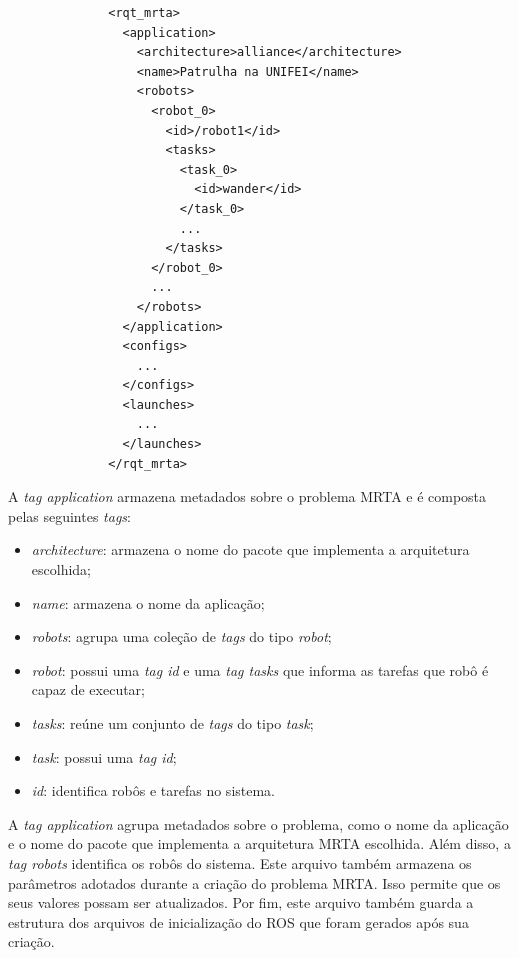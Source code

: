             \begin{lstlisting}
              <rqt_mrta>
                <application>
                  <architecture>alliance</architecture>
                  <name>Patrulha na UNIFEI</name>
                  <robots>
                    <robot_0>
                      <id>/robot1</id>
                      <tasks>
                        <task_0>
                          <id>wander</id>
                        </task_0>
                        ...
                      </tasks>
                    </robot_0>
                    ...
                  </robots>
                </application>
                <configs>
                  ...
                </configs>
                <launches>
                  ...
                </launches>
              </rqt_mrta>
            \end{lstlisting}
        
            A \textit{tag application} armazena metadados sobre o problema MRTA e é composta pelas seguintes \textit{tags}:
            
            \begin{itemize}
                \item \textit{architecture}: armazena o nome do pacote que implementa a arquitetura escolhida;
                
                \item \textit{name}: armazena o nome da aplicação;
                
                \item \textit{robots}: agrupa uma coleção de \textit{tags} do tipo \textit{robot};
                
                \item \textit{robot}: possui uma \textit{tag id} e uma \textit{tag tasks} que informa as tarefas que robô é capaz de executar;
                
                \item \textit{tasks}: reúne um conjunto de \textit{tags} do tipo \textit{task};
                
                \item \textit{task}: possui uma \textit{tag id};
                
                \item \textit{id}: identifica robôs e tarefas no sistema.
            \end{itemize}
            
            A \textit{tag application} agrupa metadados sobre o problema, como o nome da aplicação e o nome do pacote que implementa a arquitetura MRTA escolhida. Além disso, a \textit{tag robots} identifica os robôs do sistema. Este arquivo também armazena os parâmetros adotados durante a criação do problema MRTA. Isso permite que os seus valores possam ser atualizados. Por fim, este arquivo também guarda a estrutura dos arquivos de inicialização do ROS que foram gerados após sua criação. 
        
